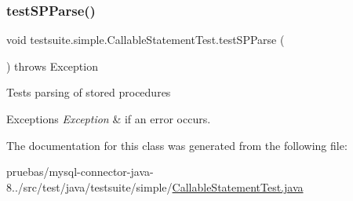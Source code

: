 \subsubsection{\texorpdfstring{test\+S\+P\+Parse()}{testSPParse()}}
{\footnotesize\ttfamily void testsuite.\+simple.\+Callable\+Statement\+Test.\+test\+S\+P\+Parse (\begin{DoxyParamCaption}{ }\end{DoxyParamCaption}) throws Exception}

Tests parsing of stored procedures


\begin{DoxyExceptions}{Exceptions}
{\em Exception} & if an error occurs. \\
\hline
\end{DoxyExceptions}


The documentation for this class was generated from the following file\+:\begin{DoxyCompactItemize}
\item 
pruebas/mysql-\/connector-\/java-\/8../src/test/java/testsuite/simple/\mbox{\hyperlink{_callable_statement_test_8java}{Callable\+Statement\+Test.\+java}}\end{DoxyCompactItemize}
